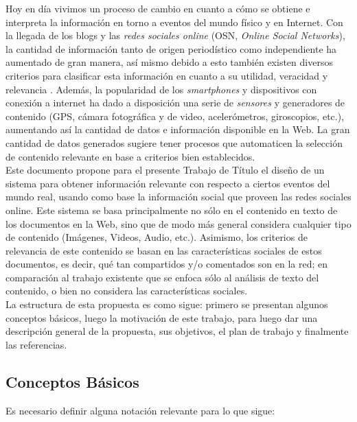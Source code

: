 \documentclass[11pt]{article}
\begin{document}
  Hoy en día vivimos un proceso de cambio en cuanto a cómo se obtiene
  e interpreta la información en torno a eventos del mundo físico y en
  Internet. Con la llegada de los blogs y las \emph{redes sociales online}
  (OSN, \emph{Online Social Networks}), la cantidad de información tanto de
  origen periodístico como independiente ha aumentado de gran manera,
  así mismo debido a esto también existen diversos criterios para
  clasificar esta información en cuanto a su utilidad, veracidad y
  relevancia \cite{selecting}. Además, la popularidad de los
  \emph{smartphones} y dispositivos con conexión a internet ha dado a
  disposición una serie de \emph{sensores} y generadores de contenido (GPS,
  cámara fotográfica y de video, acelerómetros, giroscopios, etc.),
  aumentando así la cantidad de datos e información disponible en la
  Web. La gran cantidad de datos generados sugiere tener procesos que 
  automaticen la selección de contenido relevante en base a criterios
  bien establecidos. \\

  Este documento propone para el presente Trabajo de Título el diseño 
  de un sistema para obtener información relevante con respecto a
  ciertos eventos del mundo real, usando como base la información
  social que proveen las redes sociales online. Este sistema se basa
  principalmente no sólo en el contenido en texto de los documentos
  en la Web, sino que de modo más general considera cualquier tipo de
  contenido (Imágenes, Videos, Audio, etc.). Asimismo, los criterios
  de relevancia de este contenido se basan en las características
  sociales de estos documentos, es decir, qué tan compartidos y/o
  comentados son en la red; en comparación al trabajo existente que se
  enfoca sólo al análisis de texto del contenido, o bien no considera
  las características sociales. \\

  La estructura de esta propuesta es como sigue: primero se presentan
  algunos conceptos básicos, luego la motivación de este trabajo, para
  luego dar una descripción general de la propuesta, sus objetivos, el
  plan de trabajo y finalmente las referencias.


\subsection{Conceptos Básicos}
\label{sec-1.1}

   
Es necesario definir alguna notación relevante para lo que sigue:
\end{document}
